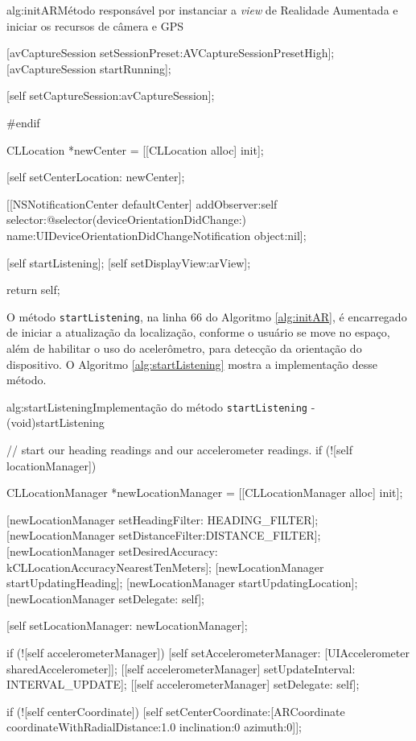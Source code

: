\begin{sourcecode}{alg:initAR}{Método responsável por instanciar a \textit{view} de Realidade Aumentada e iniciar os recursos de câmera e GPS}
{    [avCaptureSession setSessionPreset:AVCaptureSessionPresetHigh];
    [avCaptureSession startRunning];

    [self setCaptureSession:avCaptureSession];  

#endif

    CLLocation *newCenter = [[CLLocation alloc] init];

	[self setCenterLocation: newCenter];

	[[NSNotificationCenter defaultCenter] 
	 addObserver:self 
	 selector:@selector(deviceOrientationDidChange:)
     name:UIDeviceOrientationDidChangeNotification 
     object:nil];

	[self startListening];
    [self setDisplayView:arView];

  	return self;
}
\end{sourcecode}


O método \texttt{startListening}, na linha 66 do Algoritmo \ref{alg:initAR},
é encarregado de iniciar a atualização da localização, conforme o usuário
se move no espaço, além de habilitar o uso do acelerômetro, para detecção
da orientação do dispositivo. O Algoritmo \ref{alg:startListening} mostra a 
implementação desse método.

\begin{sourcecode}{alg:startListening}{Implementação do método \texttt{startListening}}
- (void)startListening
{
	// start our heading readings and our accelerometer readings.
	if (![self locationManager]) {
		CLLocationManager *newLocationManager = [[CLLocationManager alloc] init];

        [newLocationManager setHeadingFilter: HEADING_FILTER];
        [newLocationManager setDistanceFilter:DISTANCE_FILTER];
		[newLocationManager setDesiredAccuracy: kCLLocationAccuracyNearestTenMeters];
		[newLocationManager startUpdatingHeading];
		[newLocationManager startUpdatingLocation];
		[newLocationManager setDelegate: self];

        [self setLocationManager: newLocationManager];
	}

	if (![self accelerometerManager]) {
		[self setAccelerometerManager: [UIAccelerometer sharedAccelerometer]];
		[[self accelerometerManager] setUpdateInterval: INTERVAL_UPDATE];
		[[self accelerometerManager] setDelegate: self];
	}

	if (![self centerCoordinate]) 
		[self setCenterCoordinate:[ARCoordinate coordinateWithRadialDistance:1.0 inclination:0 azimuth:0]];
}
\end{sourcecode}


